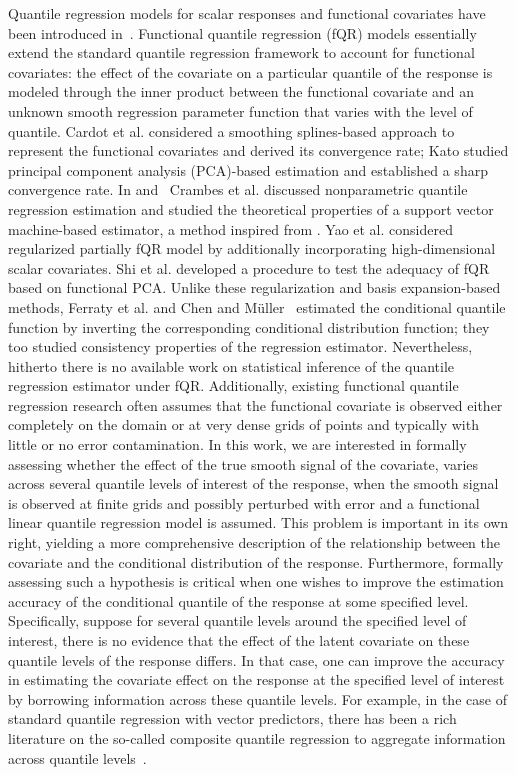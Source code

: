 \documentclass[times,sort&compress,3p]{elsarticle}
\theoremstyle{plain}%
\theoremstyle{definition}
\begin{document}
 Quantile regression models for scalar responses and functional covariates have been introduced in~\cite{Cardot+:05}. Functional quantile regression (fQR) models essentially extend the standard quantile regression framework to account for functional covariates: the effect of the covariate on a particular quantile of the response is modeled through the inner product between the functional covariate and an unknown smooth regression parameter function that varies with the level of quantile. Cardot et al. \cite{Cardot+:05} considered a smoothing splines-based approach to represent the functional covariates and derived its convergence rate; Kato \cite{Kato:12} studied principal component analysis (PCA)-based estimation and established a sharp convergence rate. In \cite{Crambes2013} and~\citep{Crambes2011} Crambes et al. discussed nonparametric quantile regression estimation and studied the theoretical properties of a support vector machine-based estimator, a method inspired from \cite{Li2007a}. Yao et al. \cite{Yao2017a} considered regularized partially fQR model by additionally incorporating high-dimensional scalar covariates. Shi et al. \cite{Shi2021} developed a procedure to test the adequacy of fQR based on functional PCA. Unlike these regularization and basis expansion-based methods, Ferraty et al. \cite{ferraty2005} and Chen and M\"{u}ller~\cite{chen+muller2012} estimated the conditional quantile function by inverting the corresponding conditional distribution function; they too studied consistency properties of the regression estimator. Nevertheless, hitherto there is no available work on statistical inference of the quantile regression estimator under fQR. Additionally, existing functional quantile regression research often assumes that the functional covariate is observed either completely on the domain or at very dense grids of points and typically with little or no error contamination.   
In this work, we are interested in formally assessing 
whether the effect of the true smooth signal of the covariate, varies across several quantile levels of interest of the response, when the smooth signal is observed at finite grids and possibly perturbed with error and a functional linear quantile regression model is assumed. This problem is important in its own right, yielding a more comprehensive description of the relationship between the covariate and the conditional distribution of the response. Furthermore, formally assessing such a hypothesis is critical when one wishes to improve the estimation accuracy of the conditional quantile of the response at some specified level. Specifically, suppose for several quantile levels around the specified level of interest, there is no evidence that the effect of the latent covariate on these quantile levels of the response differs. In that case, one can improve the accuracy in estimating the covariate effect on the response at the specified level of interest by borrowing information across these quantile levels. For example, in the case of standard quantile regression with vector predictors, there has been a rich literature on the so-called composite quantile regression to aggregate information across quantile levels~\citep{koenker1984, zou+yuan, zhao+xiao, liewen2014}. 
\end{document}
